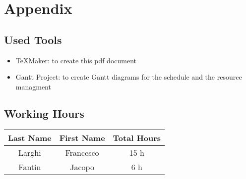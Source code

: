 \chapter{Appendix}


\section{Used Tools}

\begin{itemize}
	\item TeXMaker: to create this pdf document
	\item Gantt Project: to create Gantt diagrams for the schedule and the resource managment
\end{itemize}

\section{Working Hours}

\begin{table}[htbp]
\begin{center}
\begin{tabular}[t]{ccc}

\hline
\textbf{Last Name} & \textbf{First Name} & \textbf{Total Hours} \\
\hline
Larghi & Francesco &  15 h\\
\hline
Fantin & Jacopo &  6 h\\
\hline

\end{tabular}
\end{center}
\end{table}

